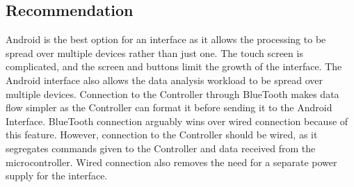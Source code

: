 \subsection{Recommendation}
Android is the best option for an interface as it allows the processing to be spread over multiple devices rather than just one.
The touch screen is complicated, and the screen and buttons limit the growth of the interface.
The Android interface also allows the data analysis workload to be spread over multiple devices.
Connection to the Controller through BlueTooth makes data flow simpler as the Controller can format it before sending it to the Android Interface.
BlueTooth connection arguably wins over wired connection because of this feature.
However, connection to the Controller should be wired, as it segregates commands given to the Controller and data received from the microcontroller.
Wired connection also removes the need for a separate power supply for the interface.
\newpage






